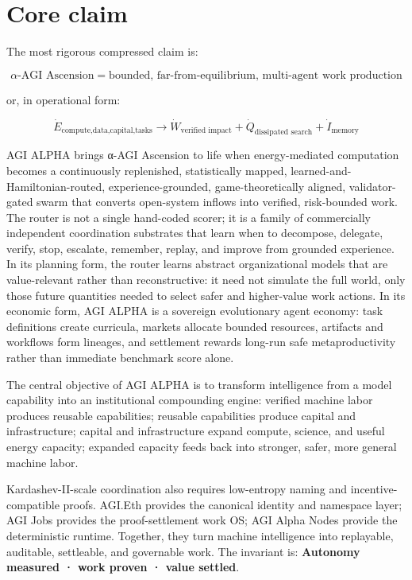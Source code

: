 \documentclass[
  11pt,
]{article}
\begin{document}
\section{Core claim}\label{core-claim}

The most rigorous compressed claim is:

\[
\boxed{
\alpha\text{-AGI Ascension}
=
\text{bounded, far-from-equilibrium, multi-agent work production}
}
\]

or, in operational form:

\[
\boxed{
\dot{E}_{\text{compute,data,capital,tasks}}
\rightarrow
\dot{W}_{\text{verified impact}}
+
\dot{Q}_{\text{dissipated search}}
+
\dot{I}_{\text{memory}}
}
\]

AGI ALPHA brings α-AGI Ascension to life when energy-mediated
computation becomes a continuously replenished, statistically mapped,
learned-and-Hamiltonian-routed, experience-grounded, game-theoretically
aligned, validator-gated swarm that converts open-system inflows into
verified, risk-bounded work. The router is not a single hand-coded
scorer; it is a family of commercially independent coordination
substrates that learn when to decompose, delegate, verify, stop,
escalate, remember, replay, and improve from grounded experience. In its
planning form, the router learns abstract organizational models that are
value-relevant rather than reconstructive: it need not simulate the full
world, only those future quantities needed to select safer and
higher-value work actions. In its economic form, AGI ALPHA is a
sovereign evolutionary agent economy: task definitions create curricula,
markets allocate bounded resources, artifacts and workflows form
lineages, and settlement rewards long-run safe metaproductivity rather
than immediate benchmark score alone.

The central objective of AGI ALPHA is to transform intelligence from a
model capability into an institutional compounding engine: verified
machine labor produces reusable capabilities; reusable capabilities
produce capital and infrastructure; capital and infrastructure expand
compute, science, and useful energy capacity; expanded capacity feeds
back into stronger, safer, more general machine labor.

Kardashev-II-scale coordination also requires low-entropy naming and
incentive-compatible proofs. AGI.Eth provides the canonical identity and
namespace layer; AGI Jobs provides the proof-settlement work OS; AGI
Alpha Nodes provide the deterministic runtime. Together, they turn
machine intelligence into replayable, auditable, settleable, and
governable work. The invariant is: \textbf{Autonomy measured · work
proven · value settled}.
\end{document}

